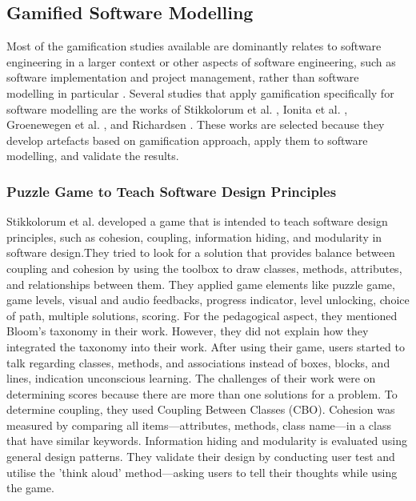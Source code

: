 \documentclass[12pt, a4paper]{report}
\begin{document}
\subsection{Gamified Software Modelling}
Most of the gamification studies available are dominantly relates to software engineering in a larger context or other aspects of software engineering, such as software implementation and project management, rather than software modelling in particular \cite{Pedreira2015}. Several studies that apply gamification specifically for software modelling are the works of Stikkolorum et al. \cite{Stikkolorum2014}, Ionita et al. \cite{Ionita2015}, Groenewegen et al. \cite{Groenewegen2010}, and Richardsen \cite{Richardsen2014}. These works are selected because they develop artefacts based on gamification approach, apply them to software modelling, and validate the results. 

\subsubsection{Puzzle Game to Teach Software Design Principles}
Stikkolorum et al. \cite{Stikkolorum2014} developed a game that is intended to teach software design principles, such as cohesion, coupling, information hiding, and modularity in software design.They tried to look for a solution that provides balance between coupling and cohesion by using the toolbox to draw classes, methods, attributes, and relationships between them. They applied game elements like puzzle game, game levels, visual and audio feedbacks, progress indicator, level unlocking, choice of path, multiple solutions, scoring. For the pedagogical aspect, they mentioned Bloom’s taxonomy in their work. However, they did not explain how they integrated the taxonomy into their work. After using their game, users started to talk regarding classes, methods, and associations instead of boxes, blocks, and lines, indication unconscious learning. The challenges of their work were on determining scores because there are more than one solutions for a problem. To determine coupling, they used Coupling Between Classes (CBO). Cohesion was measured by comparing all items—attributes, methods, class name—in a class that have similar keywords. Information hiding and modularity is evaluated using general design patterns. They validate their design by conducting user test and utilise the 'think aloud' method—asking users to tell their thoughts while using the game. 
\end{document}

